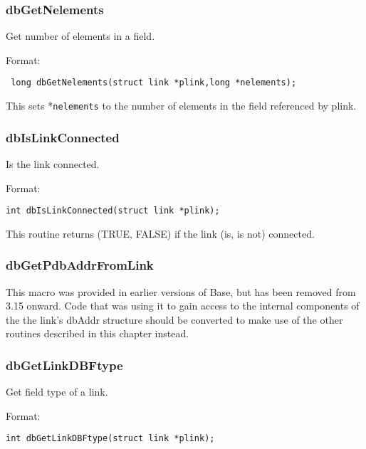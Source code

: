 \subsubsection{dbGetNelements}

Get number of elements in a field.

Format:

\begin{verbatim}
 long dbGetNelements(struct link *plink,long *nelements);
\end{verbatim}

This sets *\verb|nelements| to the number of elements in the field referenced by plink.

\subsubsection{dbIsLinkConnected}

Is the link connected.

Format:

\begin{verbatim}
int dbIsLinkConnected(struct link *plink);
\end{verbatim}

This routine returns (TRUE, FALSE) if the link (is, is not) connected.

\subsubsection{dbGetPdbAddrFromLink}

This macro was provided in earlier versions of Base, but has been removed from 3.15 onward.
Code that was using it to gain access to the internal components of the the link's dbAddr structure should be converted to make use of the other routines described in this chapter instead.

\subsubsection{dbGetLinkDBFtype}

Get field type of a link.

Format:

\begin{verbatim}
int dbGetLinkDBFtype(struct link *plink);
\end{verbatim}

